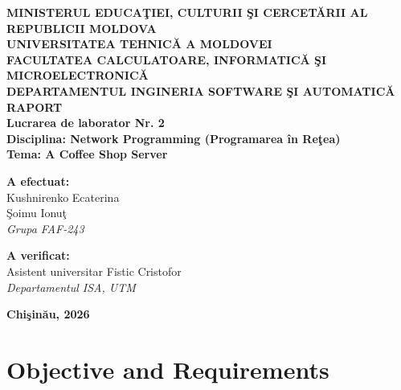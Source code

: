 \documentclass[11pt,a4paper]{article}
\begin{document}
\begin{titlepage}
    \centering
    \vspace*{0.5cm}
    {\Large \textbf{MINISTERUL EDUCA\c{T}IEI, CULTURII \c{S}I CERCET\u{A}RII AL REPUBLICII MOLDOVA}}\\[0.2cm]
    {\large \textbf{UNIVERSITATEA TEHNIC\u{A} A MOLDOVEI}}\\[0.2cm]
    {\large \textbf{FACULTATEA CALCULATOARE, INFORMATIC\u{A} \c{S}I MICROELECTRONIC\u{A}}}\\[0.2cm]
    {\large \textbf{DEPARTAMENTUL INGINERIA SOFTWARE \c{S}I AUTOMATIC\u{A}}}\\[2.5cm]

    {\Huge \textbf{RAPORT}}\\[0.4cm]
    {\LARGE \textbf{Lucrarea de laborator Nr. 2}}\\[0.3cm]
    {\Large \textbf{Disciplina: Network Programming (Programarea \^{i}n Re\c{t}ea)}}\\[0.5cm]
    {\Large \textbf{Tema: A Coffee Shop Server}}\\[2.5cm]

    \begin{minipage}{0.45\textwidth}
        \flushleft
        \textbf{A efectuat:}\\
        Kushnirenko Ecaterina \\
        \c{S}oimu Ionu\c{t} \\
        \textit{Grupa FAF-243}
    \end{minipage}
    \hfill
    \begin{minipage}{0.45\textwidth}
        \flushright
        \textbf{A verificat:}\\
        Asistent universitar Fistic Cristofor\\
        \textit{Departamentul ISA, UTM}
    \end{minipage}

    \vfill
    {\large \textbf{Chi\c{s}in\u{a}u, 2026}}
\end{titlepage}

\newpage
\tableofcontents
\newpage

\section{Objective and Requirements}
\end{document}

